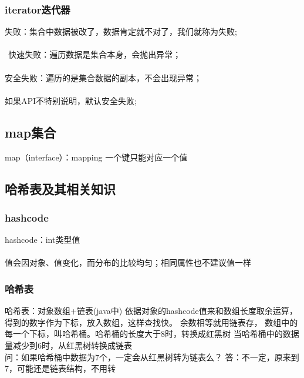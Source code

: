 \documentclass[12pt]{ctexart}
\begin{document}
\subsubsection{iterator迭代器}
失败：集合中数据被改了，数据肯定就不对了，我们就称为失败;\paragraph{}
$\ \ $快速失败：遍历数据是集合本身，会抛出异常；\paragraph{}
\quad 安全失败：遍历的是集合数据的副本，不会出现异常；\paragraph{}
\quad 如果API不特别说明，默认安全失败;\paragraph{}
\subsection{map集合}
map（interface）：mapping
一个键只能对应一个值
\subsection{哈希表及其相关知识}
\subsubsection{hashcode}
hashcode：int类型值\paragraph{}
值会因对象、值变化，而分布的比较均匀；相同属性也不建议值一样
\subsubsection{哈希表}
哈希表：对象数组+链表(java中)
依据对象的hashcode值来和数组长度取余运算，得到的数字作为下标，放入数组，这样查找快。
余数相等就用链表存，
数组中的每一个下标，叫哈希桶。哈希桶的长度大于8时，转换成红黑树
当哈希桶中的数据量减少到6时，从红黑树转换成链表
\\
问：如果哈希桶中数据为7个，一定会从红黑树转为链表么？
答：不一定，原来到7，可能还是链表结构，不用转
\end{document}
